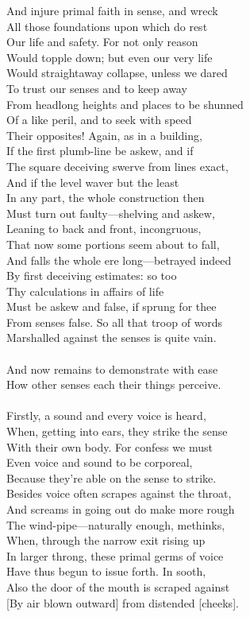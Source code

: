 And injure primal faith in sense, and wreck\\
All those foundations upon which do rest\\
Our life and safety. For not only reason\\
Would topple down; but even our very life\\
Would straightaway collapse, unless we dared\\
To trust our senses and to keep away\\
From headlong heights and places to be shunned\\
Of a like peril, and to seek with speed\\
Their opposites! Again, as in a building,\\
If the first plumb-line be askew, and if\\
The square deceiving swerve from lines exact,\\
And if the level waver but the least\\
In any part, the whole construction then\\
Must turn out faulty—shelving and askew,\\
Leaning to back and front, incongruous,\\
That now some portions seem about to fall,\\
And falls the whole ere long—betrayed indeed\\
By first deceiving estimates: so too\\
Thy calculations in affairs of life\\
Must be askew and false, if sprung for thee\\
From senses false. So all that troop of words\\
Marshalled against the senses is quite vain.\\
\\
And now remains to demonstrate with ease\\
How other senses each their things perceive.\\
\\
Firstly, a sound and every voice is heard,\\
When, getting into ears, they strike the sense\\
With their own body. For confess we must\\
Even voice and sound to be corporeal,\\
Because they're able on the sense to strike.\\
Besides voice often scrapes against the throat,\\
And screams in going out do make more rough\\
The wind-pipe—naturally enough, methinks,\\
When, through the narrow exit rising up\\
In larger throng, these primal germs of voice\\
Have thus begun to issue forth. In sooth,\\
Also the door of the mouth is scraped against\\
{}[By air blown outward] from distended [cheeks].

